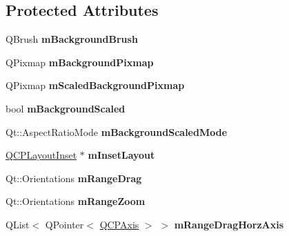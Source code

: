 \subsection*{Protected Attributes}
\begin{DoxyCompactItemize}
\item 
\mbox{\label{class_q_c_p_axis_rect_a5748e1a37f63c428e38b0a7724b46259}} 
Q\+Brush {\bfseries m\+Background\+Brush}
\item 
\mbox{\label{class_q_c_p_axis_rect_a38fb1a15f43228a0c124553649303722}} 
Q\+Pixmap {\bfseries m\+Background\+Pixmap}
\item 
\mbox{\label{class_q_c_p_axis_rect_aa74b9415598d59b49290e41e42d7ee27}} 
Q\+Pixmap {\bfseries m\+Scaled\+Background\+Pixmap}
\item 
\mbox{\label{class_q_c_p_axis_rect_a5ad835f0fae5d7cc5ada9e063641dbf1}} 
bool {\bfseries m\+Background\+Scaled}
\item 
\mbox{\label{class_q_c_p_axis_rect_a859fd368e794663e346b4f53f35078e9}} 
Qt\+::\+Aspect\+Ratio\+Mode {\bfseries m\+Background\+Scaled\+Mode}
\item 
\mbox{\label{class_q_c_p_axis_rect_a255240399e0fd24baad80cbbe46f698a}} 
\hyperlink{class_q_c_p_layout_inset}{Q\+C\+P\+Layout\+Inset} $\ast$ {\bfseries m\+Inset\+Layout}
\item 
\mbox{\label{class_q_c_p_axis_rect_aa9f107f66ca3469ad50ee6cea7c9e237}} 
Qt\+::\+Orientations {\bfseries m\+Range\+Drag}
\item 
\mbox{\label{class_q_c_p_axis_rect_a215eff671d48df2edccc36e7f976f28c}} 
Qt\+::\+Orientations {\bfseries m\+Range\+Zoom}
\item 
\mbox{\label{class_q_c_p_axis_rect_abd4f1d854b41a9c6730f3a3d605c42af}} 
Q\+List$<$ Q\+Pointer$<$ \hyperlink{class_q_c_p_axis}{Q\+C\+P\+Axis} $>$ $>$ {\bfseries m\+Range\+Drag\+Horz\+Axis}
\item 
\mbox{\label{class_q_c_p_axis_rect_a3b0a86e5bb136a458d7bc20773e45853}} 

\end{DoxyCompactItemize}
